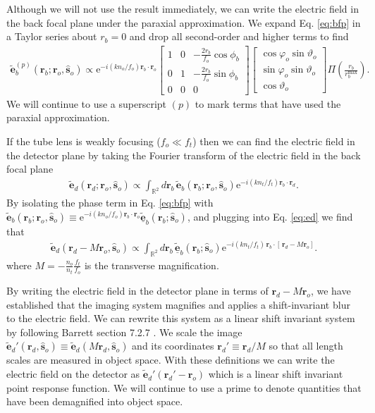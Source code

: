 \documentclass[11pt]{article}
\newcommand{\me}{\mathrm{e}}
\providecommand{\mb}[1]{\mathbf{#1}}
\providecommand{\ro}[1]{\mathbf{\mathbf{r}}_o}
\providecommand{\so}[1]{\mathbf{\hat{s}}_o}
\providecommand{\rb}[1]{\mathbf{r}_b}
\providecommand{\rd}[1]{\mathbf{r}_d}
\begin{document}
Although we will not use the result immediately, we can write the electric field
in the back focal plane under the paraxial approximation. We expand Eq. \ref{eq:bfp}
in a Taylor series about $r_b=0$ and drop all second-order and higher terms to
find
\begin{align}
  \mb{\tilde{e}}^{(p)}_b(\rb{};\ro{}, \so{}) \propto \me^{-i(kn_o/f_o)\rb{}\cdot\ro{}}
  \begin{bmatrix}
    1 & 0 &-\frac{2r_b}{f_o}\cos\phi_b\\
    0&1&-\frac{2r_b}{f_o}\sin\phi_b\\
    0&0&0
  \end{bmatrix}
  \begin{bmatrix}
    \cos\varphi_o\sin\vartheta_o\\
    \sin\varphi_o\sin\vartheta_o\\
    \cos\vartheta_o
  \end{bmatrix}
\Pi\left(\frac{r_b}{r_b^{\text{max}}}\right).\label{eq:bfppara}
\end{align}
We will continue to use a superscript $(p)$ to mark terms that have used the
paraxial approximation.

If the tube lens is weakly focusing ($f_o \ll f_t$) then we can find the
electric field in the detector plane by taking the Fourier transform of the
electric field in the back focal plane
\begin{align}
  \mb{\tilde{e}}_d(\rd{}; \ro{}, \so{}) \propto \int_{\mathbb{R}^2} d\rb{}\, \tilde{\mb{e}}_b(\rb{}; \ro{}, \so{})\me^{-i (kn_t/f_t) \rb{} \cdot \rd{}}. \label{eq:ed}
\end{align}
By isolating the phase term in Eq. \ref{eq:bfp} with
$\mb{\tilde{e}}_b(\rb{};\ro{}, \so{}) \equiv \me^{-i(kn_o/f_o)\rb{}\cdot\ro{}}
\tilde{\underline{\mb{e}}}_b(\rb{};\so{})$, and plugging into Eq. \ref{eq:ed} we find
that 
\begin{align}
  \mb{\tilde{e}}_d(\rd{} - M\ro{}, \so{}) \propto \int_{\mathbb{R}^2} d\rb{}\, \tilde{\underline{\mb{e}}}_b(\rb{}; \so{})\me^{-i (kn_t/f_t)\, \rb{} \cdot [\,\rd{} - M\ro{}]}. 
\end{align}
where $M = -\frac{n_o}{n_t}\frac{f_t}{f_o}$ is the transverse magnification.

By writing the electric field in the detector plane in terms of
$\rd{} - M\ro{}$, we have established that the imaging system magnifies and
applies a shift-invariant blur to the electric field. We can rewrite this system
as a linear shift invariant system by following Barrett section 7.2.7
\cite{barrett2004}. We scale the image
$\tilde{\mb{e}}_d'(\rd{}, \so{}) \equiv \tilde{\mb{e}}_d(M\rd{}, \so{})$ and its
coordinates $\rd{}' \equiv \rd{}/M$ so that all length scales are measured in
object space. With these definitions we can write the electric field on the
detector as $\tilde{\mb{e}}_d'(\rd{}' - \ro{})$ which is a linear shift
invariant point response function. We will continue to use a prime to denote
quantities that have been demagnified into object space.
\end{document}
